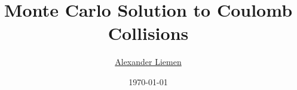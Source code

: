 \documentclass[xcolor=pdftex,table,10pt,yellow,mathserif]{beamer}
\title{Monte Carlo Solution to Coulomb Collisions}
\author{\href{mailto:alexander.liemen@inf.ethz.ch}{Alexander Liemen}}
\date{\today}
\begin{document}
 \frame{
 \maketitle
}
%
 \frame{
 \tableofcontents
}

\end{document}
